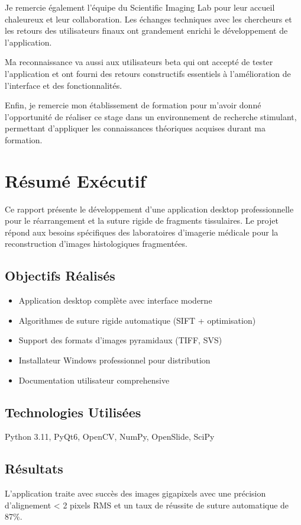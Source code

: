\documentclass[12pt,a4paper]{article}
\begin{document}
Je remercie également l'équipe du Scientific Imaging Lab pour leur accueil chaleureux et leur collaboration. Les échanges techniques avec les chercheurs et les retours des utilisateurs finaux ont grandement enrichi le développement de l'application.

Ma reconnaissance va aussi aux utilisateurs beta qui ont accepté de tester l'application et ont fourni des retours constructifs essentiels à l'amélioration de l'interface et des fonctionnalités.

Enfin, je remercie mon établissement de formation pour m'avoir donné l'opportunité de réaliser ce stage dans un environnement de recherche stimulant, permettant d'appliquer les connaissances théoriques acquises durant ma formation.

\newpage

\section*{Résumé Exécutif}

Ce rapport présente le développement d'une application desktop professionnelle pour le réarrangement et la suture rigide de fragments tissulaires. Le projet répond aux besoins spécifiques des laboratoires d'imagerie médicale pour la reconstruction d'images histologiques fragmentées.

\subsection*{Objectifs Réalisés}
\begin{itemize}
\item Application desktop complète avec interface moderne
\item Algorithmes de suture rigide automatique (SIFT + optimisation)
\item Support des formats d'images pyramidaux (TIFF, SVS)
\item Installateur Windows professionnel pour distribution
\item Documentation utilisateur comprehensive
\end{itemize}

\subsection*{Technologies Utilisées}
Python 3.11, PyQt6, OpenCV, NumPy, OpenSlide, SciPy

\subsection*{Résultats}
L'application traite avec succès des images gigapixels avec une précision d'alignement < 2 pixels RMS et un taux de réussite de suture automatique de 87\%.
\end{document}
